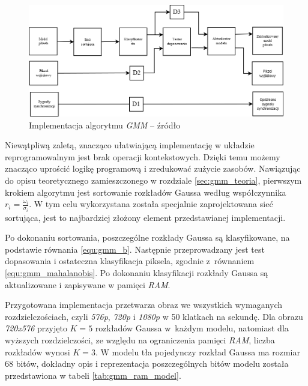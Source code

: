 	\begin{figure}[h!]
		\centering
		\includegraphics[scale=0.45]{img/4/gmm.png}
		\caption{Implementacja algorytmu \textit{GMM} -- źródło \cite{piszczek_15}}
		\label{fig:gmm_diagram}
	\end{figure}
	
Niewątpliwą zaletą, znacząco ułatwiającą implementację w układzie reprogramowalnym jest brak operacji kontekstowych. Dzięki temu możemy znacząco uprościć logikę programową i zredukować zużycie zasobów. Nawiązując do opisu teoretycznego zamieszczonego w rozdziale \ref{sec:gmm_teoria}, pierwszym krokiem algorytmu jest sortowanie rozkładów Gaussa według współczynnika $r_i = \frac{\omega_i}{\sigma_i}$. W tym celu wykorzystana została specjalnie zaprojektowana sieć sortująca, jest to najbardziej złożony element przedstawianej implementacji. 

Po dokonaniu sortowania, poszczególne rozkłady Gaussa są klasyfikowane, na podstawie równania \ref{equ:gmm_b}. Następnie przeprowadzany jest test dopasowania i ostateczna klasyfikacja piksela, zgodnie z~równaniem \ref{equ:gmm_mahalanobis}. Po dokonaniu klasyfikacji rozkłady Gaussa są aktualizowane i zapisywane w pamięci \textit{RAM}.

Przygotowana implementacja przetwarza obraz we wszystkich wymaganych rozdzielczościach, czyli \textit{576p}, \textit{720p} i \textit{1080p} w 50 klatkach na sekundę. Dla obrazu \textit{720x576} przyjęto $K=5$ rozkładów Gaussa w~każdym modelu, natomiast dla wyższych rozdzielczości, ze względu na ograniczenia pamięci \textit{RAM}, liczba rozkładów wynosi $K=3$. W modelu tła pojedynczy rozkład Gaussa ma rozmiar $68$ bitów, dokładny opis i reprezentacja poszczególnych bitów modelu została przedstawiona w tabeli \ref{tab:gmm_ram_model}.

